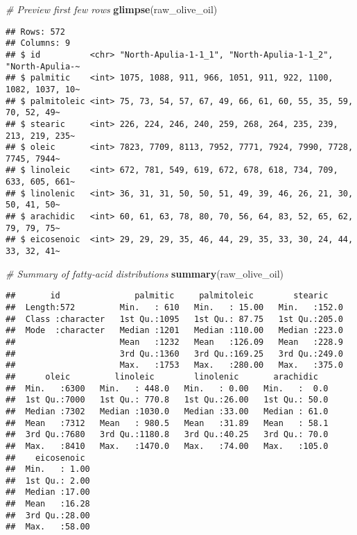 \documentclass[
]{article}
\newenvironment{Shaded}{\begin{snugshade}}{\end{snugshade}}
\newcommand{\CommentTok}[1]{\textcolor[rgb]{0.56,0.35,0.01}{\textit{#1}}}
\newcommand{\FunctionTok}[1]{\textcolor[rgb]{0.13,0.29,0.53}{\textbf{#1}}}
\newcommand{\NormalTok}[1]{#1}
\begin{document}
\begin{Shaded}
\begin{Highlighting}[]
\CommentTok{\# Preview first few rows}
\FunctionTok{glimpse}\NormalTok{(raw\_olive\_oil)}
\end{Highlighting}
\end{Shaded}

\begin{verbatim}
## Rows: 572
## Columns: 9
## $ id          <chr> "North-Apulia-1-1_1", "North-Apulia-1-1_2", "North-Apulia-~
## $ palmitic    <int> 1075, 1088, 911, 966, 1051, 911, 922, 1100, 1082, 1037, 10~
## $ palmitoleic <int> 75, 73, 54, 57, 67, 49, 66, 61, 60, 55, 35, 59, 70, 52, 49~
## $ stearic     <int> 226, 224, 246, 240, 259, 268, 264, 235, 239, 213, 219, 235~
## $ oleic       <int> 7823, 7709, 8113, 7952, 7771, 7924, 7990, 7728, 7745, 7944~
## $ linoleic    <int> 672, 781, 549, 619, 672, 678, 618, 734, 709, 633, 605, 661~
## $ linolenic   <int> 36, 31, 31, 50, 50, 51, 49, 39, 46, 26, 21, 30, 50, 41, 50~
## $ arachidic   <int> 60, 61, 63, 78, 80, 70, 56, 64, 83, 52, 65, 62, 79, 79, 75~
## $ eicosenoic  <int> 29, 29, 29, 35, 46, 44, 29, 35, 33, 30, 24, 44, 33, 32, 41~
\end{verbatim}

\begin{Shaded}
\begin{Highlighting}[]
\CommentTok{\# Summary of fatty‐acid distributions}
\FunctionTok{summary}\NormalTok{(raw\_olive\_oil)}
\end{Highlighting}
\end{Shaded}

\begin{verbatim}
##       id               palmitic     palmitoleic        stearic     
##  Length:572         Min.   : 610   Min.   : 15.00   Min.   :152.0  
##  Class :character   1st Qu.:1095   1st Qu.: 87.75   1st Qu.:205.0  
##  Mode  :character   Median :1201   Median :110.00   Median :223.0  
##                     Mean   :1232   Mean   :126.09   Mean   :228.9  
##                     3rd Qu.:1360   3rd Qu.:169.25   3rd Qu.:249.0  
##                     Max.   :1753   Max.   :280.00   Max.   :375.0  
##      oleic         linoleic        linolenic       arachidic    
##  Min.   :6300   Min.   : 448.0   Min.   : 0.00   Min.   :  0.0  
##  1st Qu.:7000   1st Qu.: 770.8   1st Qu.:26.00   1st Qu.: 50.0  
##  Median :7302   Median :1030.0   Median :33.00   Median : 61.0  
##  Mean   :7312   Mean   : 980.5   Mean   :31.89   Mean   : 58.1  
##  3rd Qu.:7680   3rd Qu.:1180.8   3rd Qu.:40.25   3rd Qu.: 70.0  
##  Max.   :8410   Max.   :1470.0   Max.   :74.00   Max.   :105.0  
##    eicosenoic   
##  Min.   : 1.00  
##  1st Qu.: 2.00  
##  Median :17.00  
##  Mean   :16.28  
##  3rd Qu.:28.00  
##  Max.   :58.00
\end{verbatim}
\end{document}
